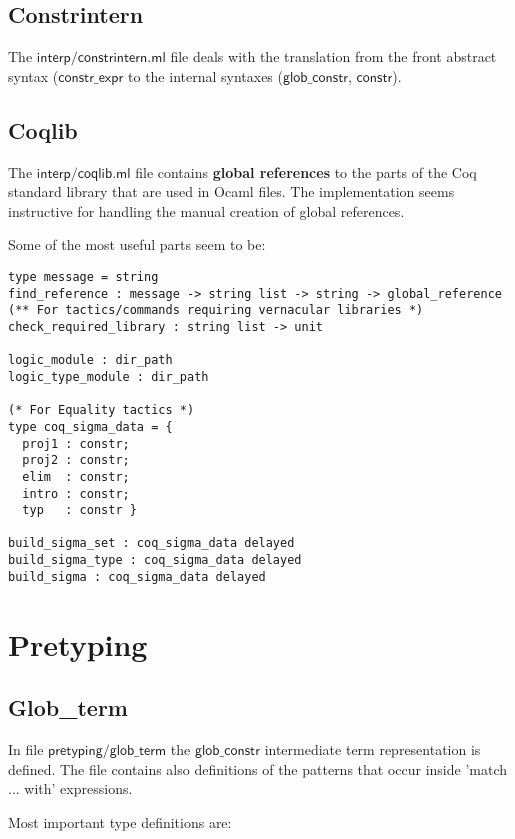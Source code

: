 \documentclass[a4paper,oneside]{book}
\newcommand{\m}[1]{\ensuremath{\mathsf{#1}}}
\begin{document}
\subsection{Constrintern}

The \m{interp/constrintern.ml} file deals with the translation from
the front abstract syntax (\m{constr\_expr} to the internal syntaxes
(\m{glob\_constr}, \m{constr}).

\subsection{Coqlib}

The \m{interp/coqlib.ml} file contains \textbf{global references} to
the parts of the Coq standard library that are used in Ocaml files.
The implementation seems instructive for handling the manual creation
of global references.

Some of the most useful parts seem to be:

\begin{lstlisting}
type message = string
find_reference : message -> string list -> string -> global_reference
(** For tactics/commands requiring vernacular libraries *)
check_required_library : string list -> unit

logic_module : dir_path
logic_type_module : dir_path

(* For Equality tactics *)
type coq_sigma_data = {
  proj1 : constr;
  proj2 : constr;
  elim  : constr;
  intro : constr;
  typ   : constr }

build_sigma_set : coq_sigma_data delayed
build_sigma_type : coq_sigma_data delayed
build_sigma : coq_sigma_data delayed
\end{lstlisting}

\section{Pretyping}

\subsection{Glob\_term}

In file \m{pretyping/glob\_term} the \m{glob\_constr} intermediate term
representation is defined. The file contains also definitions of
the patterns that occur inside 'match ... with' expressions.

Most important type definitions are:
\end{document}
